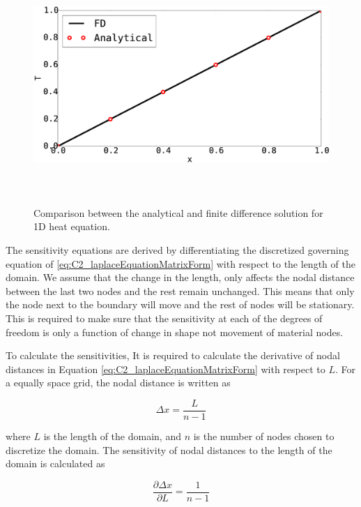 \begin{figure}[h]
	\centering
	\includegraphics[height=9.00cm]{Chapter_2/figure/finitedifference_vs_analytical.eps}
	\caption{Comparison between the analytical and finite difference solution for 1D heat equation.}
	\label{fig:C2_verificationOfSolver}
\end{figure}

The sensitivity equations are derived by differentiating the discretized governing equation of \eqref{eq:C2_laplaceEquationMatrixForm} with respect to the length of the domain. We assume that the change in the length, only affects the nodal distance between the last two nodes and the rest remain unchanged. This means that only the node next to the boundary will move and the rest of nodes will be stationary. This is required to make sure that the sensitivity at each of the degrees of freedom is only a function of change in shape not movement of material nodes.

To calculate the sensitivities, It is required to calculate the derivative of nodal distances in Equation \eqref{eq:C2_laplaceEquationMatrixForm} with respect to $L$. For a equally space grid, the nodal distance is written as

\begin{equation*}
	\Delta x = \frac{L}{n - 1}
\end{equation*}

where $L$ is the length of the domain, and $n$ is the number of nodes chosen to discretize the domain. The sensitivity of nodal distances to the length of the domain is calculated as

\begin{equation}\label{eq:C2_nodeDistanceSensitivity}
	\frac{\partial \Delta x}{\partial L} = \frac{1}{n-1}
\end{equation}

